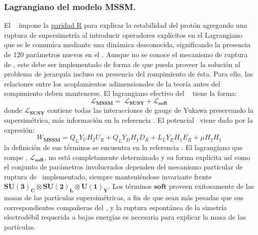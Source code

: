 
\subsubsection{Lagrangiano del modelo MSSM.}
El \MSSM ~ impone la \href{https://es.wikipedia.org/wiki/Paridad\_R}{paridad R} para explicar la estabilidad del protón agregando una ruptura de supersimetría al introducir operadores explícitos en el Lagrangiano que se le comunica mediante una dinámica desconocida, significando la presencia de 120 parámetros nuevos en el \MSSM.
Aunque no se conoce el mecanismo de ruptura de \SUSY, este debe ser implementado de forma de que pueda proveer la solución al problema de jerarquía incluso en presencia del rompimiento de ésta. Para ello, las relaciones entre los acoplamientos adimensionales de la teoría antes del rompimiento deben mantenerse. El lagrangiano efectivo del \MSSM ~ tiene la forma:
\begin{equation}\label{lagrangianoMSSM}
\mathcal{L}_\mathbf{MSSM} = ~ \mathcal{L}_\mathbf{SUSY}+\mathcal{L}_\mathbf{soft}
\end{equation}
donde $\mathcal{L}_\mathbf{SUSY}$ contiene todas las interacciones de gauge de Yukawa preservando la supersimétrica, más información en la referencia \cite{kuroda_complete_2005}. El potencial \MSSM ~viene dado por la expresión:
\begin{equation}\label{potencialMSSM}
W_\mathbf{MSSM} = Q_L Y_U H_2 U_R + Q_L Y_D H_1 D_R + L_L Y_E H_1 E_R + \mu H_2 H_1 
\end{equation}
la definición de sus términos se encuentra en la referencia \cite{kuroda_complete_2005}.
El lagrangiano que rompe \SUSY, $\mathcal{L}_\mathbf{soft}$, no está completamente determinado y su forma explícita así como el conjunto de parámetros involucrados dependen del mecanismo particular de ruptura de \SUSY ~implementado, siempre manteniéndose invariante frente $\mathbf{SU(3)_C} \otimes \mathbf{SU(2)_L} \otimes \mathbf{U(1)_Y}$. Los términos $\mathbf{soft}$ proveen exitosamente de las masas de las partículas supersimétricas, a fin de que sean más pesadas que sus correspondientes compañeras del \ME, y la ruptura espontánea de la simetría electrodébil requerida a bajas energías es necesaria para explicar la masa de las partículas.

